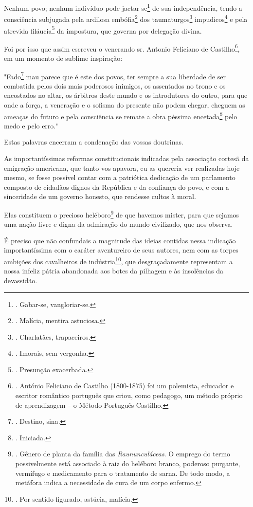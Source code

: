 Nenhum povo; nenhum indivíduo pode jactar-se\footnote{. Gabar-se,
  vangloriar-se.} de sua independência, tendo a consciência subjugada
pela ardilosa embófia\footnote{. Malícia, mentira astuciosa.} dos
taumaturgos\footnote{. Charlatães, trapaceiros.} impudicos\footnote{.
  Imorais, sem-vergonha.} e pela atrevida filáucia\footnote{. Presunção
  exacerbada.} da impostura, que governa por delegação divina.

Foi por isso que assim escreveu o venerando sr. Antonio Feliciano de
Castilho\footnote{. António Feliciano de Castilho (1800-1875) foi um
  polemista, educador e escritor romântico português que criou, como
  pedagogo, um método próprio de aprendizagem -- o Método Português
  Castilho.}, em um momento de sublime inspiração:

"Fado\footnote{. Destino, sina.} mau parece que é este dos povos, ter
sempre a sua liberdade de ser combatida pelos dois mais poderosos
inimigos, os assentados no trono e os encostados no altar, os árbitros
deste mundo e os introdutores do outro, para que onde a força, a
veneração e o sofisma do presente não podem chegar, cheguem as ameaças
do futuro e pela consciência se remate a obra péssima
encetada\footnote{. Iniciada.} pelo medo e pelo erro."

Estas palavras encerram a condenação das vossas doutrinas.

As importantíssimas reformas constitucionais indicadas pela associação
cortesã da emigração americana, que tanto vos apavora, eu as quereria
ver realizadas hoje mesmo, se fosse possível contar com a patriótica
dedicação de um parlamento composto de cidadãos dignos da República e da
confiança do povo, e com a sinceridade de um governo honesto, que
rendesse cultos à moral.

Elas constituem o precioso heléboro\footnote{. Gênero de planta da
  família das \emph{Raununculáceas}. O emprego do termo possivelmente
  está associado à raiz do heléboro branco, poderoso purgante, vermífugo
  e medicamento para o tratamento de sarna. De todo modo, a metáfora
  indica a necessidade de cura de um corpo enfermo.} de que havemos
mister, para que sejamos uma nação livre e digna da admiração do mundo
civilizado, que nos observa.

É preciso que não confundais a magnitude das ideias contidas nessa
indicação importantíssima com o caráter aventureiro de seus autores, nem
com as torpes ambições dos cavalheiros de indústria\footnote{. Por
  sentido figurado, astúcia, malícia.}, que desgraçadamente representam
a nossa infeliz pátria abandonada aos botes da pilhagem e às insolências
da devassidão.

